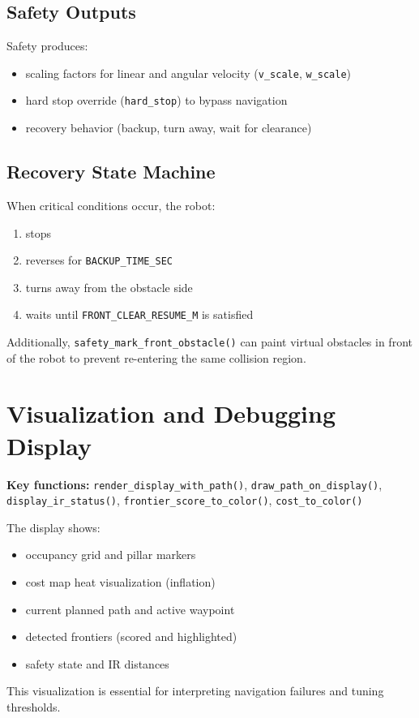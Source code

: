\documentclass[12pt,a4paper]{article}
\begin{document}
\subsection{Safety Outputs}
Safety produces:
\begin{itemize}[leftmargin=2em]
  \item scaling factors for linear and angular velocity (\texttt{v\_scale}, \texttt{w\_scale})
  \item hard stop override (\texttt{hard\_stop}) to bypass navigation
  \item recovery behavior (backup, turn away, wait for clearance)
\end{itemize}

\subsection{Recovery State Machine}
When critical conditions occur, the robot:
\begin{enumerate}[leftmargin=2em]
  \item stops
  \item reverses for \texttt{BACKUP\_TIME\_SEC}
  \item turns away from the obstacle side
  \item waits until \texttt{FRONT\_CLEAR\_RESUME\_M} is satisfied
\end{enumerate}
Additionally, \texttt{safety\_mark\_front\_obstacle()} can paint virtual obstacles in front of the robot to prevent re-entering the same collision region.

\section{Visualization and Debugging Display}
\textbf{Key functions:} \texttt{render\_display\_with\_path()}, \texttt{draw\_path\_on\_display()},
\texttt{display\_ir\_status()}, \texttt{frontier\_score\_to\_color()}, \texttt{cost\_to\_color()}

The display shows:
\begin{itemize}[leftmargin=2em]
  \item occupancy grid and pillar markers
  \item cost map heat visualization (inflation)
  \item current planned path and active waypoint
  \item detected frontiers (scored and highlighted)
  \item safety state and IR distances
\end{itemize}

This visualization is essential for interpreting navigation failures and tuning thresholds.
\end{document}
